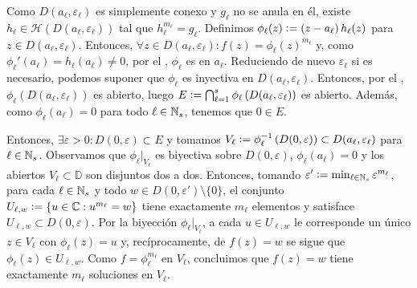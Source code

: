 \begin{dem}
    Como $D(a_\ell, \varepsilon_\ell)$ es simplemente conexo y $g_\ell$ no se anula en él, existe $h_\ell \in \mathcal{H}\left(D(a_\ell, \varepsilon_\ell)\right)$ tal que $h_\ell^{m_\ell} = g_\ell$. Definimos $\phi_\ell(z) \vcentcolon= \left(z - a_\ell\right) h_\ell(z)$ para $z \in D(a_\ell, \varepsilon_\ell)$. Entonces, $\forall z \in D(a_\ell, \varepsilon_\ell) : f(z) = \phi_\ell(z)^{m_\ell}$ y, como $\phi_\ell'(a_\ell) = h_\ell(a_\ell) \neq 0$, por el , $\phi_\ell$ es  en $a_\ell$.
    Reduciendo de nuevo $\varepsilon_\ell$ si es necesario, podemos suponer que $\phi_\ell$ es inyectiva en $D(a_\ell, \varepsilon_\ell)$. Entonces, por el , $\phi_\ell\left(D(a_\ell, \varepsilon_\ell)\right)$ es abierto, luego $E \vcentcolon= \bigcap_{\ell=1}^s \phi_\ell\left(D(a_\ell, \varepsilon_\ell)\right)$ es abierto. Además, como $\phi_\ell(a_\ell) = 0$ para todo $\ell \in \mathbb{N}_s$, tenemos que $0 \in E$.

    Entonces, $\exists \varepsilon > 0 : D(0, \varepsilon) \subset E$ y tomamos $V_\ell \vcentcolon= \phi_\ell^{-1}\left(D(0, \varepsilon)\right) \subset D(a_\ell, \varepsilon_\ell)$ para $\ell \in \mathbb{N}_s$. Observamos que $\phi_\ell\big|_{V_\ell}$ es biyectiva sobre $D(0, \varepsilon)$, $\phi_\ell\left(a_\ell\right) = 0$ y los abiertos $V_\ell \subset \mathbb{D}$ son disjuntos dos a dos. Entonces, tomando $\varepsilon' \vcentcolon= \min_{\ell \in \mathbb{N}_s} \varepsilon^{m_\ell}$, para cada $\ell \in \mathbb{N}_s$ y todo $w \in D(0, \varepsilon') \setminus \{0\}$, el conjunto $U_{\ell,w} \vcentcolon= \left\{u \in \mathbb{C} : u^{m_\ell} = w\right\}$ tiene exactamente $m_\ell$ elementos y satisface $U_{\ell,w} \subset D(0, \varepsilon)$. Por la biyección $\phi_\ell\big|_{V_\ell}$, a cada $u \in U_{\ell,w}$ le corresponde un único $z \in V_\ell$ con $\phi_\ell(z) = u$ y, recíprocamente, de $f(z) = w$ se sigue que $\phi_\ell(z) \in U_{\ell,w}$. Como $f = \phi_\ell^{m_\ell}$ en $V_\ell$, concluimos que $f(z) = w$ tiene exactamente $m_\ell$ soluciones en $V_\ell$.


\end{dem}
